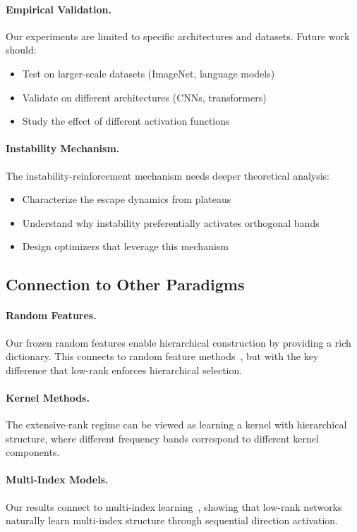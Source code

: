 \paragraph{Empirical Validation.}
Our experiments are limited to specific architectures and datasets. Future work should:
\begin{itemize}
    \item Test on larger-scale datasets (ImageNet, language models)
    \item Validate on different architectures (CNNs, transformers)
    \item Study the effect of different activation functions
\end{itemize}

\paragraph{Instability Mechanism.}
The instability-reinforcement mechanism needs deeper theoretical analysis:
\begin{itemize}
    \item Characterize the escape dynamics from plateaus
    \item Understand why instability preferentially activates orthogonal bands
    \item Design optimizers that leverage this mechanism
\end{itemize}

\subsection{Connection to Other Paradigms}

\paragraph{Random Features.}
Our frozen random features enable hierarchical construction by providing a rich dictionary. This connects to random feature methods~\cite{rahimi2007random}, but with the key difference that low-rank enforces hierarchical selection.

\paragraph{Kernel Methods.}
The extensive-rank regime can be viewed as learning a kernel with hierarchical structure, where different frequency bands correspond to different kernel components.

\paragraph{Multi-Index Models.}
Our results connect to multi-index learning~\cite{benarous2021online}, showing that low-rank networks naturally learn multi-index structure through sequential direction activation.

